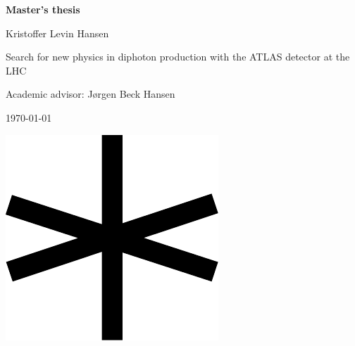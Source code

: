 \begin{titlingpage}
{\newlength{\markbump}\setlength{\markbump}{.3\paperwidth}\addtolength{\markbump}{-6mm}
\newlength{\markdown}\setlength{\markdown}{-75mm}\addtolength{\markdown}{0em}\addtolength{\markdown}{\paperheight}\addtolength{\markdown}{.15\paperwidth}
\noindent{}\makebox[0pt][r]{\raisebox{3.2mm}[0pt][0pt]{\textcolor{natgreen}{\rule{.06\paperwidth}{.7pt}}}}\makebox[0pt][l]{\raisebox{3.2mm}[0pt][0pt]{\textcolor{natgreen}{\rule{.95\paperwidth}{.7pt}}}}





\bigskip

{\sffamily
\begin{hangparas}{0em}{0}
{\textbf{ }

\vspace{2em}}

{\LARGE \textbf{Master's thesis}

\vspace{.3em}}

{\Large Kristoffer Levin Hansen}

\vspace{3em}

{\Huge \raggedright
Search for new physics in diphoton production with the ATLAS detector at the LHC
}
\vfill{}

{\Large Academic advisor: Jørgen Beck Hansen}
\vspace{28em}

\today
\end{hangparas}
}
\clearpage}
\thispagestyle{empty}
  \phantom{p}
\vspace{1.16\textwidth}

\begin{center}
\includegraphics[width=.1\textwidth]{star1}
\end{center}
\clearpage
\end{titlingpage}

